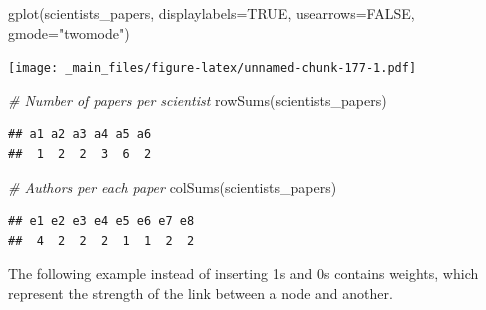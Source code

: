 \documentclass[
  notitlepage,
  onecolumn,
  openany]{book}
\newenvironment{Shaded}{\begin{snugshade}}{\end{snugshade}}
\newcommand{\AttributeTok}[1]{\textcolor[rgb]{0.77,0.63,0.00}{#1}}
\newcommand{\CommentTok}[1]{\textcolor[rgb]{0.56,0.35,0.01}{\textit{#1}}}
\newcommand{\ConstantTok}[1]{\textcolor[rgb]{0.00,0.00,0.00}{#1}}
\newcommand{\FunctionTok}[1]{\textcolor[rgb]{0.00,0.00,0.00}{#1}}
\newcommand{\NormalTok}[1]{#1}
\newcommand{\StringTok}[1]{\textcolor[rgb]{0.31,0.60,0.02}{#1}}
\begin{document}
\begin{Shaded}
\begin{Highlighting}[]
\FunctionTok{gplot}\NormalTok{(scientists\_papers, }\AttributeTok{displaylabels=}\ConstantTok{TRUE}\NormalTok{, }\AttributeTok{usearrows=}\ConstantTok{FALSE}\NormalTok{, }\AttributeTok{gmode=}\StringTok{"twomode"}\NormalTok{)}
\end{Highlighting}
\end{Shaded}

\texttt{[image: \_main\_files/figure-latex/unnamed-chunk-177-1.pdf]}

\begin{Shaded}
\begin{Highlighting}[]
\CommentTok{\# Number of papers per scientist}
\FunctionTok{rowSums}\NormalTok{(scientists\_papers)}
\end{Highlighting}
\end{Shaded}

\begin{verbatim}
## a1 a2 a3 a4 a5 a6 
##  1  2  2  3  6  2
\end{verbatim}

\begin{Shaded}
\begin{Highlighting}[]
\CommentTok{\# Authors per each paper}
\FunctionTok{colSums}\NormalTok{(scientists\_papers)}
\end{Highlighting}
\end{Shaded}

\begin{verbatim}
## e1 e2 e3 e4 e5 e6 e7 e8 
##  4  2  2  2  1  1  2  2
\end{verbatim}

The following example instead of inserting 1s and 0s contains weights, which represent the strength of the link between a node and another.
\end{document}
